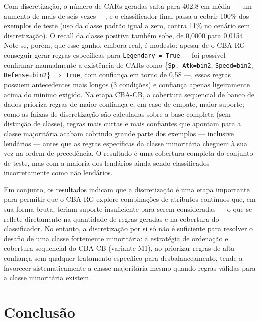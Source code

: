 \documentclass[a4paper,11pt]{article}
\begin{document}
Com discretização, o número de CARs geradas salta para 402,8 em média — um
aumento de mais de seis vezes —, e o classificador final passa a cobrir
100\% dos exemplos de teste (uso da classe padrão igual a zero, contra 11\%
no cenário sem discretização). O recall da classe positiva também sobe, de
0,0000 para 0,0154. Note-se, porém, que esse ganho, embora real, é modesto:
apesar de o CBA-RG conseguir gerar regras específicas para
\texttt{Legendary = True} — foi possível confirmar manualmente a existência
de CARs como
\{\texttt{Sp.\,Atk=bin2}, \texttt{Speed=bin2}, \texttt{Defense=bin2}\}
$\Rightarrow$ \texttt{True}, com confiança em torno de 0,58 —, essas regras
possuem antecedentes mais longos (3 condições) e confiança apenas
ligeiramente acima do mínimo exigido. Na etapa CBA-CB, a cobertura
sequencial de banco de dados prioriza regras de maior confiança e, em caso
de empate, maior suporte; como as faixas de discretização são calculadas
sobre a base completa (sem distinção de classe), regras mais curtas e mais
confiantes que apontam para a classe majoritária acabam cobrindo grande
parte dos exemplos — inclusive lendários — antes que as regras específicas
da classe minoritária cheguem à sua vez na ordem de precedência. O
resultado é uma cobertura completa do conjunto de teste, mas com a maioria
dos lendários ainda sendo classificados incorretamente como não lendários.

Em conjunto, os resultados indicam que a discretização é uma etapa
importante para permitir que o CBA-RG explore combinações de atributos
contínuos que, em sua forma bruta, teriam suporte insuficiente para serem
consideradas — o que se reflete diretamente na quantidade de regras
geradas e na cobertura do classificador. No entanto, a discretização por
si só não é suficiente para resolver o desafio de uma classe fortemente
minoritária: a estratégia de ordenação e cobertura sequencial do CBA-CB
(variante M1), ao priorizar regras de alta confiança sem qualquer
tratamento específico para desbalanceamento, tende a favorecer
sistematicamente a classe majoritária mesmo quando regras válidas para a
classe minoritária existem.

\section{Conclusão}
\end{document}
